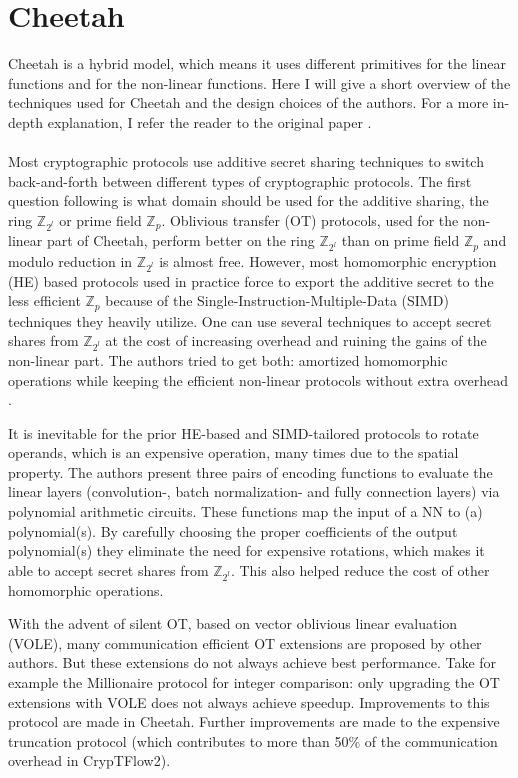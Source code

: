\documentclass[../thesis.tex]{subfiles}
\begin{document}
\section{Cheetah}
Cheetah is a hybrid model, which means it uses different primitives for the linear functions and for the non-linear functions. Here I will give a short overview of the techniques used for Cheetah and the design choices of the authors. For a more in-depth explanation, I refer the reader to the original paper \parencite{cheetah}. \paragraph{}

Most cryptographic protocols use additive secret sharing techniques to switch back-and-forth between different types of cryptographic protocols. The first question following is what domain should be used for the additive sharing, the ring $\mathbb{Z}_{2^l}$ or prime field $\mathbb{Z}_{p}$. Oblivious transfer (OT) protocols, used for the non-linear part of Cheetah, perform better on the ring $\mathbb{Z}_{2^l}$ than on prime field $\mathbb{Z}_{p}$ and modulo reduction in $\mathbb{Z}_{2^l}$ is almost free. However, most homomorphic encryption (HE) based protocols used in practice force to export the additive secret to the less efficient $\mathbb{Z}_{p}$ because of the Single-Instruction-Multiple-Data (SIMD) techniques they heavily utilize. One can use several techniques to accept secret shares from $\mathbb{Z}_{2^l}$ at the cost of increasing overhead and ruining the gains of the non-linear part. The authors tried to get both: amortized homomorphic operations while keeping the efficient non-linear protocols without extra overhead \parencite[p 810]{cheetah}.

It is inevitable for the prior HE-based and SIMD-tailored protocols to rotate operands, which is an expensive operation, many times due to the spatial property. The authors present three pairs of encoding functions to evaluate the linear layers (convolution-, batch normalization- and fully connection layers) via polynomial arithmetic circuits. These functions map the input of a NN to (a) polynomial(s). By carefully choosing the proper coefficients of the output polynomial(s) they eliminate the need for expensive rotations, which makes it able to accept secret shares from $\mathbb{Z}_{2^l}$. This also helped reduce the cost of other homomorphic operations. 

With the advent of silent OT, based on vector oblivious linear evaluation (VOLE), many communication efficient OT extensions are proposed by other authors. But these extensions do not always achieve best performance. Take for example the Millionaire protocol for integer comparison: only upgrading the OT extensions with VOLE does not always achieve speedup. Improvements to this protocol are made in Cheetah. Further improvements are made to the expensive truncation protocol (which contributes to more than 50\% of the communication overhead in CrypTFlow2).  
\end{document}
